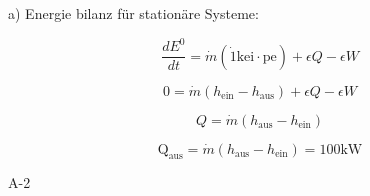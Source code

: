 a) Energie bilanz für stationäre Systeme:

\[
\frac{dE^0}{dt} = \dot{m} (\dot{1} \text{kei} \cdot \text{pe}) + \epsilon Q - \epsilon W
\]

\[
0 = \dot{m} (h_{\text{ein}} - h_{\text{aus}}) + \epsilon Q - \epsilon W
\]

\[
Q = \dot{m} (h_{\text{aus}} - h_{\text{ein}})
\]

\[
\text{Q}_{\text{aus}} = \dot{m} (h_{\text{aus}} - h_{\text{ein}}) = 100 \text{kW}
\]

A-2